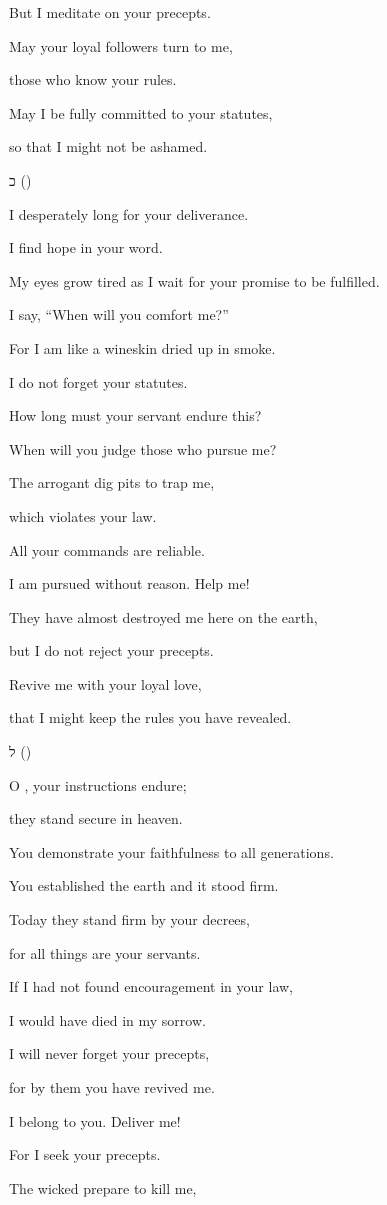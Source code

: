 {\par }{\Q But I
meditate
on your precepts.
\par }{\Q {}May your loyal followers
turn
to me,
\par }{\Q those who know
your rules.
\par }{\Q {}May I be
fully
committed
to your statutes,
\par }{\Q so that I might
not
be ashamed.
\par }{\SH כ ({})
\par }{\Q {}I desperately long for your deliverance.
\par }{\Q I find hope in your word.
\par }{\Q {}My eyes
grow tired
as I wait for your promise to be fulfilled.
\par }{\Q I say, “When
will you comfort me?”
\par }{\Q {}For
I am like a wineskin
dried up in smoke.
\par }{\Q I do not
forget
your statutes.
\par }{\Q {}How
long
must your servant
endure
this?

\par }{\Q When will you judge
those who pursue me?
\par }{\Q {}The arrogant
dig
pits
to trap me,

\par }{\Q which
violates your law.
\par }{\Q {}All
your commands
are reliable.
\par }{\Q I am pursued
without reason.
Help me!
\par }{\Q {}They have almost
destroyed
me here on the earth,
\par }{\Q but I
do not
reject
your precepts.
\par }{\Q {}Revive
me with your loyal love,
\par }{\Q that I might keep
the rules
you have revealed.
\par }{\SH ל ({})
\par }{\Q {}O
{}, your instructions endure;
\par }{\Q they stand secure in heaven.
\par }{\Q {}You demonstrate
your faithfulness
to all
generations.
\par }{\Q You established
the earth
and it stood firm.
\par }{\Q {}Today
they stand
firm by your decrees,
\par }{\Q for
all
things are your servants.
\par }{\Q {}If
I had not
found encouragement
in your law,
\par }{\Q I would have died
in my sorrow.
\par }{\Q {}I will never
forget
your precepts,
\par }{\Q for
by them you have revived me.
\par }{\Q {}I
belong to you. Deliver
me!
\par }{\Q For
I seek
your precepts.
\par }{\Q {}The wicked
prepare
to kill
me,

}
